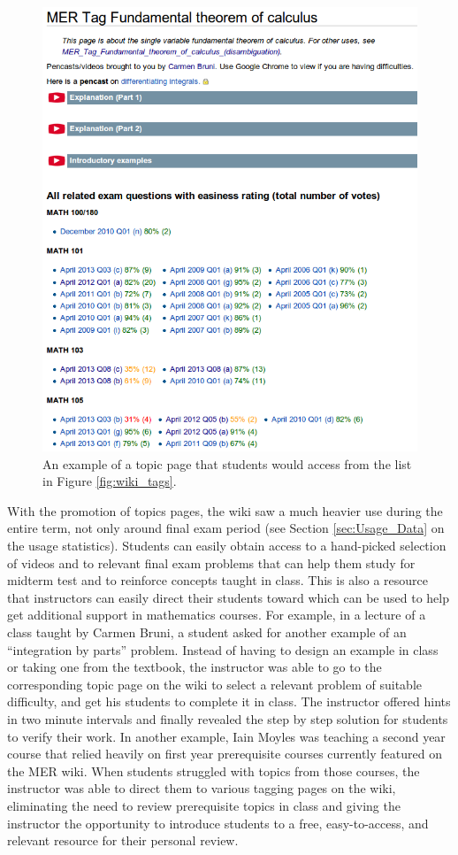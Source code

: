 \documentclass{primus}
\begin{document}
\begin{figure}[H]
\centering
\includegraphics[width=\textwidth]{figs/Topics_Page.png}
\caption{An example of a topic page that students would access from the list in Figure \ref{fig:wiki_tags}.}\label{fig:topic_page}
\end{figure}

\noindent{}With the promotion of topics pages, the wiki saw a much heavier use during the entire term, not only around final exam period (see Section \ref{sec:Usage_Data} on the usage statistics). Students can easily obtain access to a hand-picked selection of videos and to relevant final exam problems that can help them study for midterm test and to reinforce concepts taught in class. This is also a resource that instructors can easily direct their students toward which can be used to help get additional support in mathematics courses. For example, in a lecture of a class taught by Carmen Bruni, a student asked for another example of an “integration by parts” problem. Instead of having to design an example in class or taking one from the textbook, the instructor was able to go to the corresponding topic page on the wiki to select a relevant problem of suitable difficulty, and get his students to complete it in class. The instructor offered hints in two minute intervals and finally revealed the step by step solution for students to verify their work.  In another example, Iain Moyles was teaching a second year course that relied heavily on first year prerequisite courses currently featured on the MER wiki.  When students struggled with topics from those courses, the instructor was able to direct them to various tagging pages on the wiki, eliminating the need to review prerequisite topics in class and giving the instructor the opportunity to introduce students to a free, easy-to-access, and relevant resource for their personal review.
\end{document}
